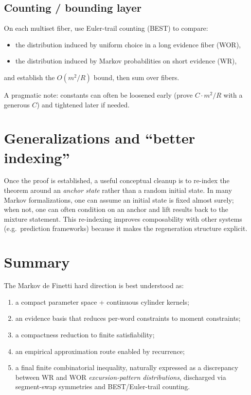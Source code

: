 \documentclass[11pt]{article}
\begin{document}
\subsection{Counting / bounding layer}

On each multiset fiber, use Euler-trail counting (BEST) to compare:
\begin{itemize}
\item the distribution induced by uniform choice in a long evidence fiber (WOR),
\item the distribution induced by Markov probabilities on short evidence (WR),
\end{itemize}
and establish the $O(m^2/R)$ bound, then sum over fibers.

A pragmatic note: constants can often be loosened early (prove $C\cdot m^2/R$ with a generous
$C$) and tightened later if needed.

\section{Generalizations and ``better indexing''}

Once the proof is established, a useful conceptual cleanup is to re-index the theorem around an
\emph{anchor state} rather than a random initial state. In many Markov formalizations, one can
assume an initial state is fixed almost surely; when not, one can often condition on an anchor and
lift results back to the mixture statement. This re-indexing improves composability with other
systems (e.g.\ prediction frameworks) because it makes the regeneration structure explicit.

\section{Summary}

The Markov de Finetti hard direction is best understood as:
\begin{enumerate}
\item a compact parameter space + continuous cylinder kernels;
\item an evidence basis that reduces per-word constraints to moment constraints;
\item a compactness reduction to finite satisfiability;
\item an empirical approximation route enabled by recurrence;
\item a final finite combinatorial inequality, naturally expressed as a discrepancy between WR and
WOR \emph{excursion-pattern distributions}, discharged via segment-swap symmetries and BEST/Euler-trail
counting.
\end{enumerate}
\end{document}
